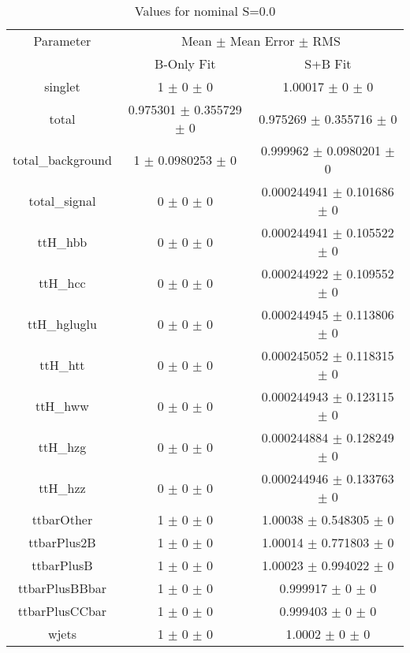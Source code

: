 \begin{table}
\centering
\caption{Values for nominal S=0.0}
\begin{tabular}{ccc}
\toprule
Parameter & \multicolumn{2}{c}{Mean $\pm$ Mean Error $\pm$ RMS}\\
 & B-Only Fit & S+B Fit\\
\midrule
singlet & \num{1} $\pm$ \num{0} $\pm$ \num{0} & \num{1.00017} $\pm$ \num{0} $\pm$ \num{0}\\
total & \num{0.975301} $\pm$ \num{0.355729} $\pm$ \num{0} & \num{0.975269} $\pm$ \num{0.355716} $\pm$ \num{0}\\
total\_background & \num{1} $\pm$ \num{0.0980253} $\pm$ \num{0} & \num{0.999962} $\pm$ \num{0.0980201} $\pm$ \num{0}\\
total\_signal & \num{0} $\pm$ \num{0} $\pm$ \num{0} & \num{0.000244941} $\pm$ \num{0.101686} $\pm$ \num{0}\\
ttH\_hbb & \num{0} $\pm$ \num{0} $\pm$ \num{0} & \num{0.000244941} $\pm$ \num{0.105522} $\pm$ \num{0}\\
ttH\_hcc & \num{0} $\pm$ \num{0} $\pm$ \num{0} & \num{0.000244922} $\pm$ \num{0.109552} $\pm$ \num{0}\\
ttH\_hgluglu & \num{0} $\pm$ \num{0} $\pm$ \num{0} & \num{0.000244945} $\pm$ \num{0.113806} $\pm$ \num{0}\\
ttH\_htt & \num{0} $\pm$ \num{0} $\pm$ \num{0} & \num{0.000245052} $\pm$ \num{0.118315} $\pm$ \num{0}\\
ttH\_hww & \num{0} $\pm$ \num{0} $\pm$ \num{0} & \num{0.000244943} $\pm$ \num{0.123115} $\pm$ \num{0}\\
ttH\_hzg & \num{0} $\pm$ \num{0} $\pm$ \num{0} & \num{0.000244884} $\pm$ \num{0.128249} $\pm$ \num{0}\\
ttH\_hzz & \num{0} $\pm$ \num{0} $\pm$ \num{0} & \num{0.000244946} $\pm$ \num{0.133763} $\pm$ \num{0}\\
ttbarOther & \num{1} $\pm$ \num{0} $\pm$ \num{0} & \num{1.00038} $\pm$ \num{0.548305} $\pm$ \num{0}\\
ttbarPlus2B & \num{1} $\pm$ \num{0} $\pm$ \num{0} & \num{1.00014} $\pm$ \num{0.771803} $\pm$ \num{0}\\
ttbarPlusB & \num{1} $\pm$ \num{0} $\pm$ \num{0} & \num{1.00023} $\pm$ \num{0.994022} $\pm$ \num{0}\\
ttbarPlusBBbar & \num{1} $\pm$ \num{0} $\pm$ \num{0} & \num{0.999917} $\pm$ \num{0} $\pm$ \num{0}\\
ttbarPlusCCbar & \num{1} $\pm$ \num{0} $\pm$ \num{0} & \num{0.999403} $\pm$ \num{0} $\pm$ \num{0}\\
wjets & \num{1} $\pm$ \num{0} $\pm$ \num{0} & \num{1.0002} $\pm$ \num{0} $\pm$ \num{0}\\
\bottomrule
\end{tabular}
\end{table}